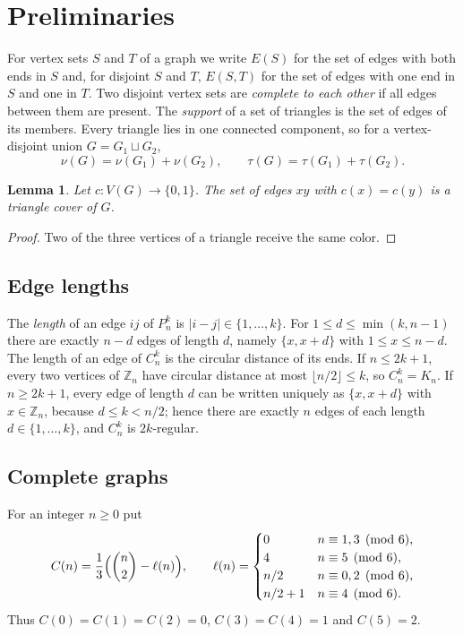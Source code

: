 \documentclass{amsart}
\newtheorem{lemma}[theorem]{Lemma}
\theoremstyle{definition}
\theoremstyle{remark}
\numberwithin{equation}{section}
\numberwithin{table}{section}
\newcommand{\Z}{\mathbb{Z}}
\begin{document}
\section{Preliminaries}\label{sec:prelim}

For vertex sets $S$ and $T$ of a graph we write $E(S)$ for the set of edges with both ends in $S$ and, for disjoint $S$ and $T$, $E(S,T)$ for the set of edges with one end in $S$ and one in $T$. Two disjoint vertex sets are \emph{complete to each other} if all edges between them are present. The \emph{support} of a set of triangles is the set of edges of its members. Every triangle lies in one connected component, so for a vertex-disjoint union $G=G_1\sqcup G_2$,
\begin{equation}\label{eq:additive}
\nu(G)=\nu(G_1)+\nu(G_2),\qquad \tau(G)=\tau(G_1)+\tau(G_2).
\end{equation}

\begin{lemma}\label{lem:cut}
Let $c\colon V(G)\to\{0,1\}$. The set of edges $xy$ with $c(x)=c(y)$ is a triangle cover of $G$.
\end{lemma}

\begin{proof}
Two of the three vertices of a triangle receive the same color.
\end{proof}

\subsection{Edge lengths}\label{ssec:lengths}
The \emph{length} of an edge $ij$ of $P_n^k$ is $|i-j|\in\{1,\dots,k\}$. For $1\le d\le\min(k,n-1)$ there are exactly $n-d$ edges of length $d$, namely $\{x,x+d\}$ with $1\le x\le n-d$. The length of an edge of $C_n^k$ is the circular distance of its ends. If $n\le2k+1$, every two vertices of $\Z_n$ have circular distance at most $\lfloor n/2\rfloor\le k$, so $C_n^k=K_n$. If $n\ge2k+1$, every edge of length $d$ can be written uniquely as $\{x,x+d\}$ with $x\in\Z_n$, because $d\le k<n/2$; hence there are exactly $n$ edges of each length $d\in\{1,\dots,k\}$, and $C_n^k$ is $2k$-regular.

\subsection{Complete graphs}
For an integer $n\ge0$ put
\[
C(n)=\frac13\Bigl(\binom n2-\ell(n)\Bigr),\qquad
\ell(n)=\begin{cases}
0 & n\equiv1,3 \pmod 6,\\
4 & n\equiv5 \pmod 6,\\
n/2 & n\equiv0,2 \pmod 6,\\
n/2+1 & n\equiv4 \pmod 6.
\end{cases}
\]
Thus $C(0)=C(1)=C(2)=0$, $C(3)=C(4)=1$ and $C(5)=2$.
\end{document}
